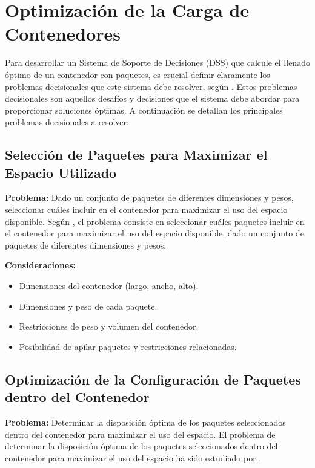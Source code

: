 \documentclass[9pt,a4paper]{rho}
\begin{document}
\section{Optimización de la Carga de Contenedores}

Para desarrollar un Sistema de Soporte de Decisiones (DSS) que calcule el llenado óptimo de un contenedor con paquetes, es crucial definir claramente los problemas decisionales que este sistema debe resolver, según \textcite{murty2005decision}. Estos problemas decisionales son aquellos desafíos y decisiones que el sistema debe abordar para proporcionar soluciones óptimas. A continuación se detallan los principales problemas decisionales a resolver:

\subsection{Selección de Paquetes para Maximizar el Espacio Utilizado}

\textbf{Problema:} Dado un conjunto de paquetes de diferentes dimensiones y pesos, seleccionar cuáles incluir en el contenedor para maximizar el uso del espacio disponible. Según \textcite{gilmore1965multistage}, el problema consiste en seleccionar cuáles paquetes incluir en el contenedor para maximizar el uso del espacio disponible, dado un conjunto de paquetes de diferentes dimensiones y pesos.

\textbf{Consideraciones:}
\begin{itemize}
    \item Dimensiones del contenedor (largo, ancho, alto).
    \item Dimensiones y peso de cada paquete.
    \item Restricciones de peso y volumen del contenedor.
    \item Posibilidad de apilar paquetes y restricciones relacionadas.
\end{itemize}

\subsection{Optimización de la Configuración de Paquetes dentro del Contenedor}

\textbf{Problema:} Determinar la disposición óptima de los paquetes seleccionados dentro del contenedor para maximizar el uso del espacio. El problema de determinar la disposición óptima de los paquetes seleccionados dentro del contenedor para maximizar el uso del espacio ha sido estudiado por \textcite{zhao2016comparative}.
\end{document}
